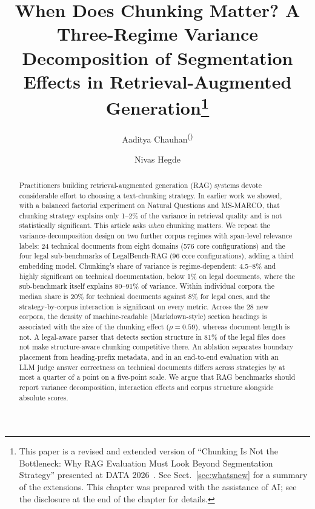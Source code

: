 \documentclass[runningheads]{llncs}
\begin{document}
\title{When Does Chunking Matter? A Three-Regime Variance Decomposition of Segmentation Effects in Retrieval-Augmented Generation\thanks{This paper is a revised and extended version of ``Chunking Is Not the Bottleneck: Why RAG Evaluation Must Look Beyond Segmentation Strategy'' presented at DATA 2026~\cite{chauhan2026chunking}. See Sect.~\ref{sec:whatsnew} for a summary of the extensions. This chapter was prepared with the assistance of AI; see the disclosure at the end of the chapter for details.}}

\author{Aaditya Chauhan\textsuperscript{(\Envelope)} \and
Nivas Hegde}

\maketitle

\begin{abstract}
Practitioners building retrieval-augmented generation (RAG) systems devote considerable effort to choosing a text-chunking strategy. In earlier work we showed, with a balanced factorial experiment on Natural Questions and MS-MARCO, that chunking strategy explains only 1--2\% of the variance in retrieval quality and is not statistically significant. This article asks \emph{when} chunking matters. We repeat the variance-decomposition design on two further corpus regimes with span-level relevance labels: 24 technical documents from eight domains (576 core configurations) and the four legal sub-benchmarks of LegalBench-RAG (96 core configurations), adding a third embedding model. Chunking's share of variance is regime-dependent: 4.5--8\% and highly significant on technical documentation, below 1\% on legal documents, where the sub-benchmark itself explains 80--91\% of variance. Within individual corpora the median share is 20\% for technical documents against 8\% for legal ones, and the strategy-by-corpus interaction is significant on every metric. Across the 28 new corpora, the density of machine-readable (Markdown-style) section headings is associated with the size of the chunking effect ($\rho = 0.59$), whereas document length is not. A legal-aware parser that detects section structure in 81\% of the legal files does not make structure-aware chunking competitive there. An ablation separates boundary placement from heading-prefix metadata, and in an end-to-end evaluation with an LLM judge answer correctness on technical documents differs across strategies by at most a quarter of a point on a five-point scale. We argue that RAG benchmarks should report variance decomposition, interaction effects and corpus structure alongside absolute scores.

\end{abstract}
\end{document}
